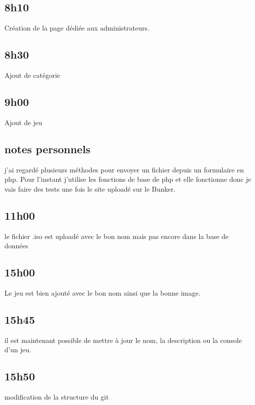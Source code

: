 \documentclass[a4paper,12pt,french]{sphinxmanual}
\begin{document}
\subsection{8h10}
\label{\detokenize{logbook:id28}}
\sphinxAtStartPar
Création de la page dédiée aux administrateurs.


\subsection{8h30}
\label{\detokenize{logbook:id29}}
\sphinxAtStartPar
Ajout de catégorie


\subsection{9h00}
\label{\detokenize{logbook:id30}}
\sphinxAtStartPar
Ajout de jeu


\subsection{notes personnels}
\label{\detokenize{logbook:notes-personnels}}
\sphinxAtStartPar
j’ai regardé plusieurs méthodes pour envoyer un fichier depuis un formulaire en php. Pour l’instant j’utilise les fonctions de base de php et elle fonctionne donc je vais faire des tests une fois le site uploadé sur le Bunker.


\subsection{11h00}
\label{\detokenize{logbook:id31}}
\sphinxAtStartPar
le fichier .iso est uploadé avec le bon nom mais pas encore dans la base de données


\subsection{15h00}
\label{\detokenize{logbook:id32}}
\sphinxAtStartPar
Le jeu est bien ajouté avec le bon nom ainsi que la bonne image.


\subsection{15h45}
\label{\detokenize{logbook:h45}}
\sphinxAtStartPar
il est maintenant possible de mettre à jour le nom, la description ou la console d’un jeu.


\subsection{15h50}
\label{\detokenize{logbook:id33}}
\sphinxAtStartPar
modification de la structure du git
\end{document}
